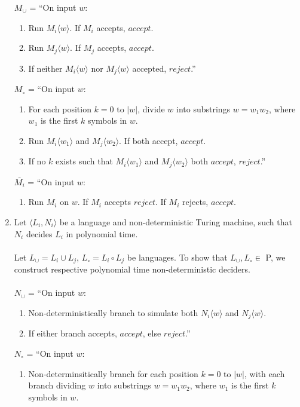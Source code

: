 \documentclass[11pt]{article}
\renewcommand{\indent}{\hspace{1em}}
\begin{document}
\begin{enumerate}[7.1]
    $M_\cup$ = ``On input $w$:
    \begin{enumerate}[\indent1.]
      \item Run $M_i\langle w \rangle$. If $M_i$ accepts, $accept$.
      \item Run $M_j\langle w \rangle$. If $M_j$ accepts, $accept$.
      \item If neither $M_i\langle w \rangle$ nor $M_j\langle w \rangle$ accepted, $reject$.''
    \end{enumerate}
    $M_\circ$ = ``On input $w$:
    \begin{enumerate}[\indent1.]
      \item For each position $k = 0$ to $|w|$, divide $w$ into substrings $w = w_1w_2$, where $w_1$ is the first $k$ symbols in $w$.
      \item \indent Run $M_i\langle w_1 \rangle$ and $M_j\langle w_2 \rangle$. If both accept, $accept$.
      \item If no $k$ exists such that $M_i\langle w_1 \rangle$ and $M_j\langle w_2 \rangle$ both $accept$, $reject$.''
    \end{enumerate}
    $\bar{M_i}$ = ``On input $w$:
    \begin{enumerate}[\indent1.]
      \item Run $M_i$ on $w$. If $M_i$ accepts $reject$. If $M_i$ rejects, $accept$.
    \end{enumerate}
  \item Let $\langle L_i, N_i \rangle$ be a language and non-deterministic Turing machine, such that $N_i$ decides $L_i$ in polynomial time. \\\\
    Let $L_\cup = L_i \cup L_j$, $L_\circ = L_i \circ L_j$ be languages. To show that $L_\cup, L_\circ \in$ P, we construct respective polynomial time non-deterministic deciders. \\\\
    $N_\cup$ = ``On input $w$:
    \begin{enumerate}[\indent1.]
      \item Non-deterministically branch to simulate both $N_i\langle w \rangle$ and $N_j\langle w \rangle$.
      \item If either branch accepts, $accept$, else $reject$.''
    \end{enumerate}
    $N_\circ$ = ``On input $w$:
    \begin{enumerate}[\indent1.]
      \item Non-determinsitically branch for each position $k = 0$ to $|w|$, with each branch dividing $w$ into substrings $w = w_1w_2$, where $w_1$ is the first $k$ symbols in $w$.

\end{enumerate}
\end{enumerate}
\end{document}
